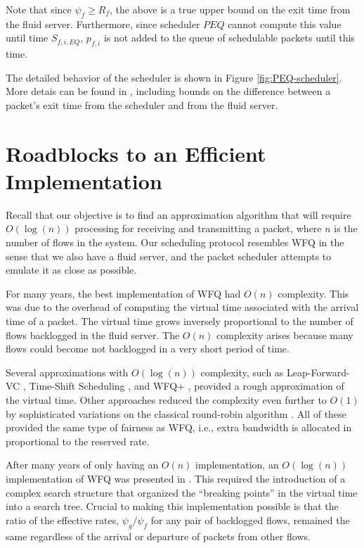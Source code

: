 \documentclass[conference]{IEEEtran}
\begin{document}
Note that since $\psi_{f} \geq R_{f}$, the above is a true upper bound on the 
exit time from the fluid server. Furthermore, since scheduler $PEQ$ cannot 
compute this value until time $S_{f,i,EQ}$, $p_{f,i}$ is not added to the queue 
of schedulable packets until this time. 

The detailed behavior of the scheduler is shown in Figure 
\ref{fig:PEQ-scheduler}. More detais can be found in \cite{Cobb-REQ}, including 
bounds on the difference between a packet's exit time from the scheduler and 
from the fluid server.



%
\section{Roadblocks to an Efficient Implementation}
%

Recall that our objective is to find an approximation algorithm that will 
require $O(\log(n))$ processing for receiving and transmitting a packet, where 
$n$ is the number of flows in the system. Our scheduling protocol resembles WFQ 
in the sense that we also have a fluid server, and the packet scheduler 
attempts to emulate it as close as possible.

For many years, the best implementation of WFQ had $O(n)$ complexity. This was 
due to the overhead of computing the virtual time associated with the arrival 
time of a packet. The virtual time grows inversely proportional to the number 
of flows backlogged in the fluid server. The $O(n)$ complexity arises because 
many flows could become not backlogged in a very short period of time.

Several approximations with $O(\log(n))$ complexity, such as Leap-Forward-VC 
\cite{leapforward}, Time-Shift Scheduling \cite{Cobb-TS-Scheduling-ToN}, and 
WFQ+ \cite{Hui-WF2Q}, provided a rough approximation of the virtual time.  
Other approaches reduced the complexity even further to $O(1)$ by sophisticated 
variations on the classical round-robin algorithm 
\cite{SRR}\cite{G-3}\cite{Stratified}\cite{FRR}\cite{GRR}\cite{VWQGRR}.  All of 
these provided the same type of fairness as WFQ, i.e., extra bandwidth is 
allocated in proportional to the reserved rate. 

After many years of only having an $O(n)$ implementation, an $O(\log(n))$ 
implementation of WFQ was presented in \cite{WFQlogN}. This required the 
introduction of a complex search structure that organized the ``breaking 
points'' in the virtual time into a search tree. Crucial to making this 
implementation possible is that the ratio of the effective rates, 
$\psi_g/\psi_f$ for any pair of backlogged flows, remained the same regardless 
of the arrival or departure of packets from other flows.
\end{document}

